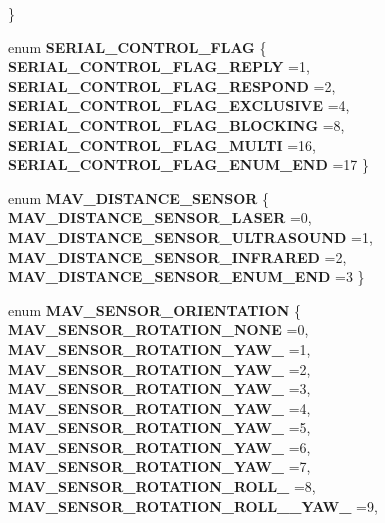 \begin{DoxyCompactItemize}
 \}
\item 
enum \textbf{ S\+E\+R\+I\+A\+L\+\_\+\+C\+O\+N\+T\+R\+O\+L\+\_\+\+F\+L\+AG} \{ \newline
\textbf{ S\+E\+R\+I\+A\+L\+\_\+\+C\+O\+N\+T\+R\+O\+L\+\_\+\+F\+L\+A\+G\+\_\+\+R\+E\+P\+LY} =1, 
\textbf{ S\+E\+R\+I\+A\+L\+\_\+\+C\+O\+N\+T\+R\+O\+L\+\_\+\+F\+L\+A\+G\+\_\+\+R\+E\+S\+P\+O\+ND} =2, 
\textbf{ S\+E\+R\+I\+A\+L\+\_\+\+C\+O\+N\+T\+R\+O\+L\+\_\+\+F\+L\+A\+G\+\_\+\+E\+X\+C\+L\+U\+S\+I\+VE} =4, 
\textbf{ S\+E\+R\+I\+A\+L\+\_\+\+C\+O\+N\+T\+R\+O\+L\+\_\+\+F\+L\+A\+G\+\_\+\+B\+L\+O\+C\+K\+I\+NG} =8, 
\newline
\textbf{ S\+E\+R\+I\+A\+L\+\_\+\+C\+O\+N\+T\+R\+O\+L\+\_\+\+F\+L\+A\+G\+\_\+\+M\+U\+L\+TI} =16, 
\textbf{ S\+E\+R\+I\+A\+L\+\_\+\+C\+O\+N\+T\+R\+O\+L\+\_\+\+F\+L\+A\+G\+\_\+\+E\+N\+U\+M\+\_\+\+E\+ND} =17
 \}
\item 
enum \textbf{ M\+A\+V\+\_\+\+D\+I\+S\+T\+A\+N\+C\+E\+\_\+\+S\+E\+N\+S\+OR} \{ \textbf{ M\+A\+V\+\_\+\+D\+I\+S\+T\+A\+N\+C\+E\+\_\+\+S\+E\+N\+S\+O\+R\+\_\+\+L\+A\+S\+ER} =0, 
\textbf{ M\+A\+V\+\_\+\+D\+I\+S\+T\+A\+N\+C\+E\+\_\+\+S\+E\+N\+S\+O\+R\+\_\+\+U\+L\+T\+R\+A\+S\+O\+U\+ND} =1, 
\textbf{ M\+A\+V\+\_\+\+D\+I\+S\+T\+A\+N\+C\+E\+\_\+\+S\+E\+N\+S\+O\+R\+\_\+\+I\+N\+F\+R\+A\+R\+ED} =2, 
\textbf{ M\+A\+V\+\_\+\+D\+I\+S\+T\+A\+N\+C\+E\+\_\+\+S\+E\+N\+S\+O\+R\+\_\+\+E\+N\+U\+M\+\_\+\+E\+ND} =3
 \}
\item 
enum \textbf{ M\+A\+V\+\_\+\+S\+E\+N\+S\+O\+R\+\_\+\+O\+R\+I\+E\+N\+T\+A\+T\+I\+ON} \{ \newline
\textbf{ M\+A\+V\+\_\+\+S\+E\+N\+S\+O\+R\+\_\+\+R\+O\+T\+A\+T\+I\+O\+N\+\_\+\+N\+O\+NE} =0, 
\textbf{ M\+A\+V\+\_\+\+S\+E\+N\+S\+O\+R\+\_\+\+R\+O\+T\+A\+T\+I\+O\+N\+\_\+\+Y\+A\+W\+\_} =1, 
\textbf{ M\+A\+V\+\_\+\+S\+E\+N\+S\+O\+R\+\_\+\+R\+O\+T\+A\+T\+I\+O\+N\+\_\+\+Y\+A\+W\+\_} =2, 
\textbf{ M\+A\+V\+\_\+\+S\+E\+N\+S\+O\+R\+\_\+\+R\+O\+T\+A\+T\+I\+O\+N\+\_\+\+Y\+A\+W\+\_} =3, 
\newline
\textbf{ M\+A\+V\+\_\+\+S\+E\+N\+S\+O\+R\+\_\+\+R\+O\+T\+A\+T\+I\+O\+N\+\_\+\+Y\+A\+W\+\_} =4, 
\textbf{ M\+A\+V\+\_\+\+S\+E\+N\+S\+O\+R\+\_\+\+R\+O\+T\+A\+T\+I\+O\+N\+\_\+\+Y\+A\+W\+\_} =5, 
\textbf{ M\+A\+V\+\_\+\+S\+E\+N\+S\+O\+R\+\_\+\+R\+O\+T\+A\+T\+I\+O\+N\+\_\+\+Y\+A\+W\+\_} =6, 
\textbf{ M\+A\+V\+\_\+\+S\+E\+N\+S\+O\+R\+\_\+\+R\+O\+T\+A\+T\+I\+O\+N\+\_\+\+Y\+A\+W\+\_} =7, 
\newline
\textbf{ M\+A\+V\+\_\+\+S\+E\+N\+S\+O\+R\+\_\+\+R\+O\+T\+A\+T\+I\+O\+N\+\_\+\+R\+O\+L\+L\+\_} =8, 
\textbf{ M\+A\+V\+\_\+\+S\+E\+N\+S\+O\+R\+\_\+\+R\+O\+T\+A\+T\+I\+O\+N\+\_\+\+R\+O\+L\+L\+\_\+\_\+\+Y\+A\+W\+\_} =9, 

\end{DoxyCompactItemize}
